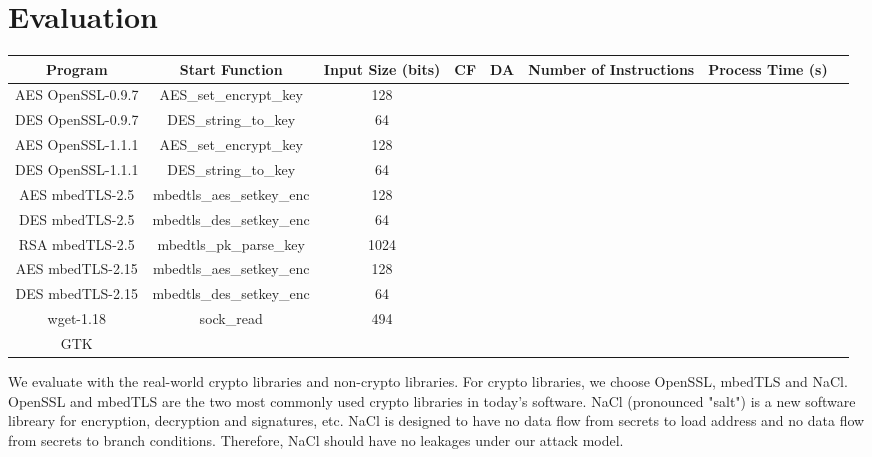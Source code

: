 \section{Evaluation}
\label{res_overview}
\begin{table*}[]
    \begin{tabular}{c c c c c c c l}
    \hline
    Program                & Start Function             & Input Size (bits)   & CF   & DA     & Number of Instructions & Process Time (s) \\ \hline
    AES OpenSSL-0.9.7      & AES\_set\_encrypt\_key     &     128             &      &        &                        &                  \\
    DES OpenSSL-0.9.7      & DES\_string\_to\_key       &     64              &      &        &                        &                  \\
    AES OpenSSL-1.1.1      & AES\_set\_encrypt\_key     &     128             &      &        &                        &                  \\
    DES OpenSSL-1.1.1      & DES\_string\_to\_key       &     64              &      &        &                        &                  \\
    AES mbedTLS-2.5        & mbedtls\_aes\_setkey\_enc	&     128             &      &        &                        &                  \\
    DES mbedTLS-2.5        & mbedtls\_des\_setkey\_enc  &     64              &      &        &                        &                  \\
    RSA mbedTLS-2.5        & mbedtls\_pk\_parse\_key    &     1024            &      &        &                        &                  \\
    AES mbedTLS-2.15       & mbedtls\_aes\_setkey\_enc  &     128             &      &        &                        &                  \\
    DES mbedTLS-2.15       & mbedtls\_des\_setkey\_enc  &     64              &      &        &                        &                  \\
    wget-1.18              & sock\_read                 &     494             &      &        &                        &                  \\
    GTK                    &                            &                     &      &        &                        &                  \\
    \hline
    \end{tabular}
\end{table*}
We evaluate \tool{} with the real-world crypto libraries and non-crypto libraries. 
For crypto libraries, we choose OpenSSL, mbedTLS and NaCl. 
OpenSSL and mbedTLS are the two most commonly used
crypto libraries in today's software. NaCl (pronounced "salt") is a 
new software libreary for encryption, decryption and signatures, etc.
NaCl is designed to have no data flow from secrets to load address and no data 
flow from secrets to branch conditions. Therefore, NaCl should have no leakages
under our attack model. 

